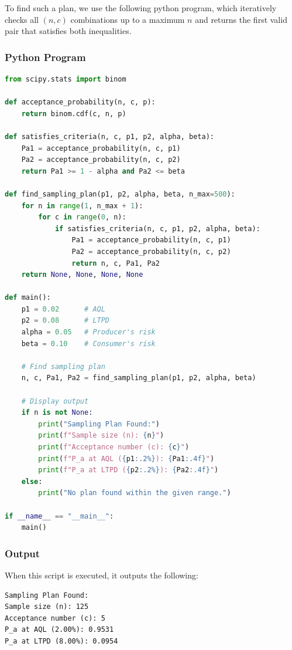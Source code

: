 \documentclass[twoside]{book}
\begin{document}
To find such a plan, we use the following python program, which iteratively checks all $(n, c)$ combinations up to a maximum $n$ and returns the first valid pair that satisfies both inequalities.

\subsubsection{Python Program}

\begin{lstlisting}[language=Python]
from scipy.stats import binom

def acceptance_probability(n, c, p):
    return binom.cdf(c, n, p)

def satisfies_criteria(n, c, p1, p2, alpha, beta):
    Pa1 = acceptance_probability(n, c, p1)
    Pa2 = acceptance_probability(n, c, p2)
    return Pa1 >= 1 - alpha and Pa2 <= beta

def find_sampling_plan(p1, p2, alpha, beta, n_max=500):
    for n in range(1, n_max + 1):
        for c in range(0, n):
            if satisfies_criteria(n, c, p1, p2, alpha, beta):
                Pa1 = acceptance_probability(n, c, p1)
                Pa2 = acceptance_probability(n, c, p2)
                return n, c, Pa1, Pa2
    return None, None, None, None

def main():
    p1 = 0.02      # AQL
    p2 = 0.08      # LTPD
    alpha = 0.05   # Producer's risk
    beta = 0.10    # Consumer's risk

    # Find sampling plan
    n, c, Pa1, Pa2 = find_sampling_plan(p1, p2, alpha, beta)

    # Display output
    if n is not None:
        print("Sampling Plan Found:")
        print(f"Sample size (n): {n}")
        print(f"Acceptance number (c): {c}")
        print(f"P_a at AQL ({p1:.2%}): {Pa1:.4f}")
        print(f"P_a at LTPD ({p2:.2%}): {Pa2:.4f}")
    else:
        print("No plan found within the given range.")

if __name__ == "__main__":
    main()
\end{lstlisting}

\subsubsection*{Output}
When this script is executed, it outputs the following:

\begin{lstlisting}
Sampling Plan Found:
Sample size (n): 125
Acceptance number (c): 5
P_a at AQL (2.00%): 0.9531
P_a at LTPD (8.00%): 0.0954
\end{lstlisting}
\end{document}
